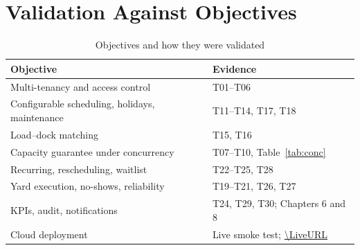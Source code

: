 \section{Validation Against Objectives}
\begin{table}[H]
\centering
\small
\caption{Objectives and how they were validated}
\label{tab:val}
\begin{tabularx}{\textwidth}{>{\raggedright\arraybackslash}p{5.2cm}X}
\toprule
\textbf{Objective} & \textbf{Evidence} \\
\midrule
Multi-tenancy and access control & T01--T06 \\
Configurable scheduling, holidays, maintenance & T11--T14, T17, T18 \\
Load--dock matching & T15, T16 \\
Capacity guarantee under concurrency & T07--T10, Table~\ref{tab:conc} \\
Recurring, rescheduling, waitlist & T22--T25, T28 \\
Yard execution, no-shows, reliability & T19--T21, T26, T27 \\
KPIs, audit, notifications & T24, T29, T30; Chapters 6 and 8 \\
Cloud deployment & Live smoke test; \url{\LiveURL} \\
\bottomrule
\end{tabularx}
\end{table}
